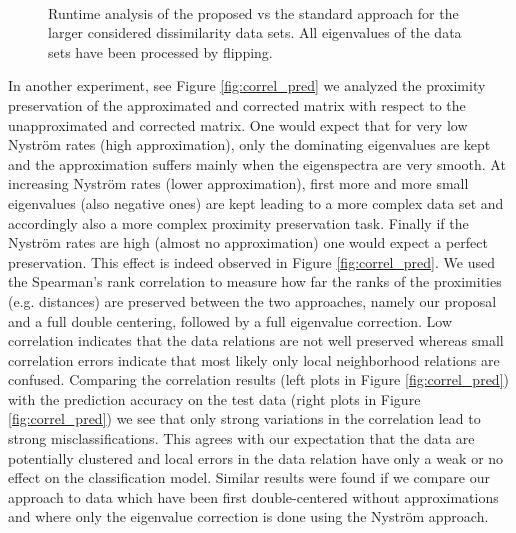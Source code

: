 \documentclass[twoside,11pt]{article}
\begin{document}
\begin{figure*}
\caption{Runtime analysis of the proposed vs the standard approach for the larger considered dissimilarity data
sets. All eigenvalues of the data sets have been processed by flipping. }\label{fig:diss_rt}
\begin{center}
	\\
\end{center}
\end{figure*}
In another experiment, see Figure \ref{fig:correl_pred} we analyzed the proximity preservation of the approximated and corrected
matrix with respect to the unapproximated and corrected matrix. One would expect that for very low Nystr\"om rates (high approximation),
only the dominating eigenvalues are kept and the approximation suffers mainly when the eigenspectra are very smooth. At
increasing Nystr\"om rates (lower approximation), first more and more small eigenvalues (also negative ones) are kept leading to 
a more complex data set and accordingly also a more complex proximity preservation task. Finally if the Nystr\"om rates are high
(almost no approximation) one would expect a perfect preservation. This effect is indeed observed in Figure \ref{fig:correl_pred}.
We used the Spearman's rank correlation to measure how far the ranks of the proximities (e.g. distances) are preserved between
the two approaches, namely our proposal and a full double centering, followed by a full eigenvalue correction.
Low correlation indicates that the data relations are not well preserved whereas small correlation errors 
indicate that most likely only local neighborhood relations are confused. Comparing the correlation results (left plots in Figure \ref{fig:correl_pred})
with the prediction accuracy on the test data (right plots in Figure \ref{fig:correl_pred}) we see that only strong variations in the
correlation lead to strong misclassifications. This agrees with our expectation that the data are potentially clustered and local
errors in the data relation have only a weak or no effect on the classification model. Similar results were found if we compare our approach
to data which have been first double-centered without approximations and where only the eigenvalue correction is done using the Nystr\"om
approach.
\end{document}
